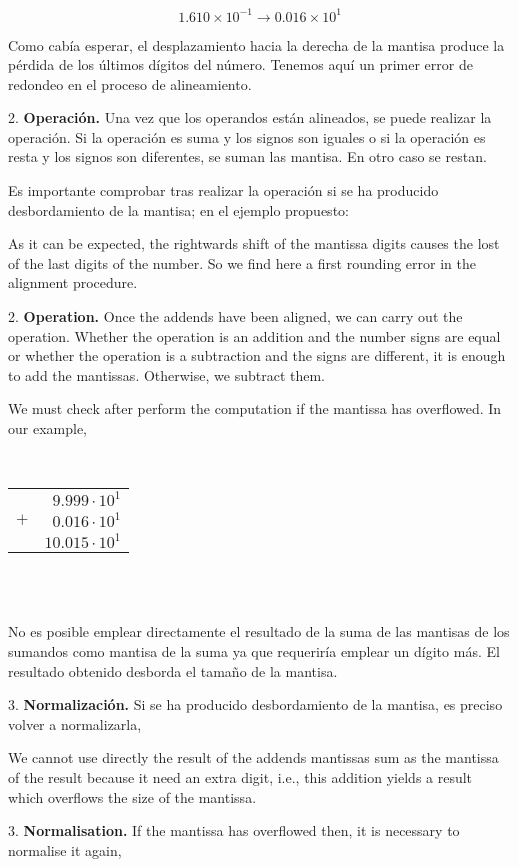 \begin{equation*}
1.610\times 10^{-1}\rightarrow 0.016\times10^1
\end{equation*}
\begin{paracol}{2}
Como cabía esperar, el desplazamiento hacia la derecha de la mantisa produce la pérdida de los últimos dígitos del número. Tenemos aquí un primer error de redondeo en el proceso de alineamiento.

2. \textbf{Operación.}
Una vez que los operandos están alineados, se puede realizar la operación. Si la operación es suma y los signos son iguales o si la operación es resta y los signos son diferentes, se suman las mantisa. En otro caso se restan.

Es importante comprobar tras realizar la operación si se ha producido desbordamiento de la mantisa; en el ejemplo propuesto:

\switchcolumn
As it can be expected,  the rightwards shift of the mantissa digits causes the lost of the last digits of the number. So we find here a first rounding error in the alignment procedure.

2. \textbf{Operation.} Once the addends have been aligned, we can carry out the operation. Whether the operation is an addition and the number signs are equal or whether the operation is a subtraction and the signs are different, it is enough to add the mantissas. Otherwise, we subtract them.

We must check after perform the computation if the mantissa has overflowed. In our example,      
\end{paracol}
\begin{minipage}{\textwidth}
	\centering
\ \\
\begin{tabular}{r r}
&$9.999\cdot10^1$\\
$+$&$0.016\cdot10^1$\\
\hline
&$10.015\cdot10^1$
\end{tabular}\\
\ \\
\end{minipage}

\begin{paracol}{2}
No es posible emplear directamente el resultado de la suma de las mantisas de los sumandos como mantisa de la suma ya que requeriría emplear un dígito más. El resultado obtenido desborda el tamaño de la mantisa.

3. \textbf{Normalización.}
Si se ha producido desbordamiento de la mantisa, es preciso volver a normalizarla,

\switchcolumn
We cannot use directly the result of the addends mantissas sum as the mantissa of the result because it need an extra digit, i.e., this addition yields a result which overflows the size of the mantissa.

3. \textbf{Normalisation.}
If the mantissa has overflowed then, it is necessary to normalise it again,  
\end{paracol}

